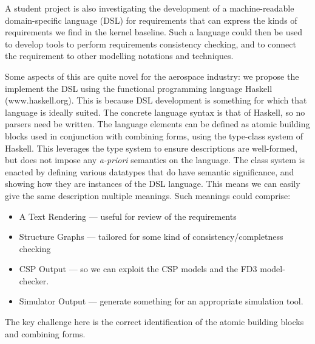 A student project is also investigating the development
of a machine-readable domain-specific language (DSL) for requirements
that can express the kinds of requirements we find in the kernel baseline.
Such a language could then be used to develop tools to
perform requirements consistency checking,
and to connect the requirement to other modelling notations and techniques.

Some aspects of this are quite novel for the aerospace industry:
we propose the implement the DSL using the functional programming language
Haskell (www.haskell.org).
This is because DSL development is something for which that language is ideally suited.
The concrete language syntax is that of Haskell,
so no parsers need be written.
The language elements can be defined as atomic building blocks
used in conjunction with combining forms, using the type-class system
of Haskell.
This leverages the type system to ensure descriptions are well-formed,
but does not impose any \emph{a-priori} semantics on the language.
The class system is enacted by defining various
datatypes that do have semantic significance,
and showing how they are instances of the DSL language.
This means we can easily give the same description multiple meanings.
Such meanings could comprise:
\begin{itemize}
  \item A Text Rendering --- useful for review of the requirements
  \item Structure Graphs --- tailored for some kind of consistency/completness checking
  \item CSP Output --- so we can exploit the CSP models and the FD3 model-checker.
  \item Simulator Output --- generate something for an appropriate simulation tool.
\end{itemize}

The key challenge here is the correct identification
of the atomic building blocks and combining forms.
